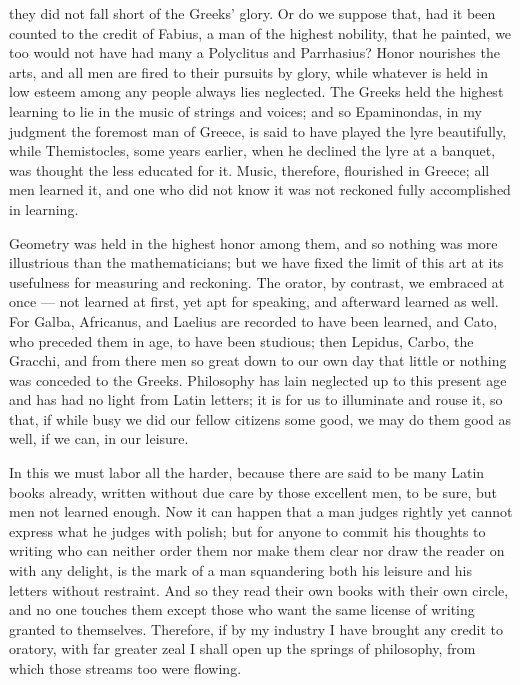  they did not fall short of the Greeks' glory. Or do we suppose that, had it been counted to the credit of Fabius, a man of the highest nobility, that he painted, we too would not have had many a Polyclitus and Parrhasius? Honor nourishes the arts, and all men are fired to their pursuits by glory, while whatever is held in low esteem among any people always lies neglected. The Greeks held the highest learning to lie in the music of strings and voices; and so Epaminondas, in my judgment the foremost man of Greece, is said to have played the lyre beautifully, while Themistocles, some years earlier, when he declined the lyre at a banquet, was thought the less educated for it. Music, therefore, flourished in Greece; all men learned it, and one who did not know it was not reckoned fully accomplished in learning.

 Geometry was held in the highest honor among them, and so nothing was more illustrious than the mathematicians; but we have fixed the limit of this art at its usefulness for measuring and reckoning. The orator, by contrast, we embraced at once — not learned at first, yet apt for speaking, and afterward learned as well. For Galba, Africanus, and Laelius are recorded to have been learned, and Cato, who preceded them in age, to have been studious; then Lepidus, Carbo, the Gracchi, and from there men so great down to our own day that little or nothing was conceded to the Greeks. Philosophy has lain neglected up to this present age and has had no light from Latin letters; it is for us to illuminate and rouse it, so that, if while busy we did our fellow citizens some good, we may do them good as well, if we can, in our leisure.

 In this we must labor all the harder, because there are said to be many Latin books already, written without due care by those excellent men, to be sure, but men not learned enough. Now it can happen that a man judges rightly yet cannot express what he judges with polish; but for anyone to commit his thoughts to writing who can neither order them nor make them clear nor draw the reader on with any delight, is the mark of a man squandering both his leisure and his letters without restraint. And so they read their own books with their own circle, and no one touches them except those who want the same license of writing granted to themselves. Therefore, if by my industry I have brought any credit to oratory, with far greater zeal I shall open up the springs of philosophy, from which those streams too were flowing.

